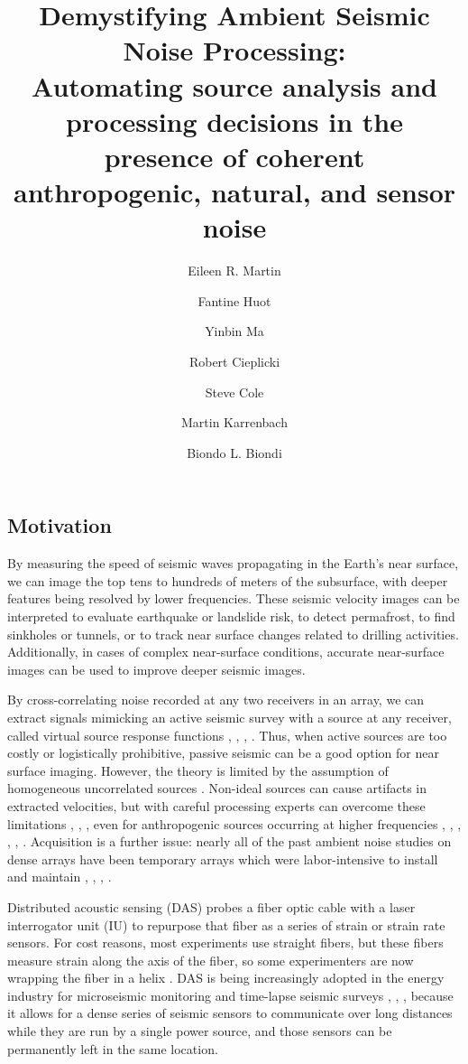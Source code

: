 \documentclass[11pt]{article}
\title{\vspace{-1.8cm} \Large Demystifying Ambient Seismic Noise Processing: \\Automating source analysis and processing decisions in the presence of coherent anthropogenic, natural, and sensor noise \vspace{-0.5cm}}
\author[1,2]{\small Eileen R. Martin}
\author[2]{Fantine Huot}
\author[1]{Yinbin Ma}
\author[2]{Robert Cieplicki}
\author[3]{Steve Cole}
\author[3]{Martin Karrenbach}
\author[1,2]{Biondo L. Biondi \vspace{-0.4cm}}
\affil[1]{Institute for Computational and Mathematical Engineering, Stanford University, Stanford, CA}
\affil[2]{Department of Geophysics, Stanford University, Stanford, CA}
\affil[3]{OptaSense, Brea, CA}
\date{}
\begin{document}
\maketitle

\vspace{-1.8cm}
\subsection*{Motivation} 
\vspace{-0.2cm}
By measuring the speed of seismic waves propagating in the Earth's near surface, we can image the top tens to hundreds of meters of the subsurface, with deeper features being resolved by lower frequencies. These seismic velocity images can be interpreted to evaluate earthquake or landslide risk, to detect permafrost, to find sinkholes or tunnels, or to track near surface changes related to drilling activities. Additionally, in cases of complex near-surface conditions, accurate near-surface images can be used to improve deeper seismic images.
\par
By cross-correlating noise recorded at any two receivers in an array, we can extract signals mimicking an active seismic survey with a source at any receiver, called virtual source response functions \cite{Lobkis2001}, \cite{Lin2008}, \cite{Wapenaar2010A}, \cite{Wapenaar2010B}. Thus, when active sources are too costly or logistically prohibitive, passive seismic can be a good option for near surface imaging. However, the theory is limited by the assumption of homogeneous uncorrelated sources \cite{Wapenaar2010A}. Non-ideal sources can cause artifacts in extracted velocities, but with careful processing experts can overcome these limitations \cite{Bensen2007}, \cite{Daskalakis2016}, \cite{Zhan2013}, even for anthropogenic sources occurring at higher frequencies \cite{Girard2016}, \cite{Martin2015}, \cite{Martin2016}, \cite{Nakata2011}, \cite{Nakata2015}, \cite{Zeng2017}. Acquisition is a further issue: nearly all of the past ambient noise studies on dense arrays have been temporary arrays which were labor-intensive to install and maintain \cite{Lin2008}, \cite{Nakata2011}, \cite{Nakata2015}, \cite{Zeng2017}. 
\par
Distributed acoustic sensing (DAS) probes a fiber optic cable with a laser interrogator unit (IU) to repurpose that fiber as a series of strain or strain rate sensors. For cost reasons, most experiments use straight fibers, but these fibers measure strain along the axis of the fiber, so some experimenters are now wrapping the fiber in a helix \cite{Kuvshinov2016}. DAS is being increasingly adopted in the energy industry for microseismic monitoring \cite{Webster2013} and time-lapse seismic surveys \cite{Daley2013}, \cite{Mateeva2014}, \cite{Bakku2015}, \cite{Miller2016} because it allows for a dense series of seismic sensors to communicate over long distances while they are run by a single power source, and those sensors can be permanently left in the same location.
\end{document}
